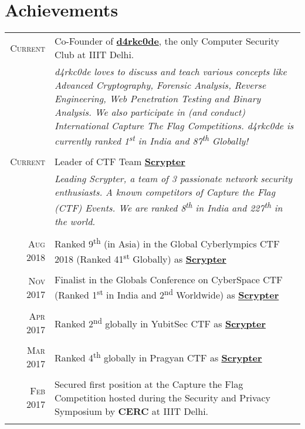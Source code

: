 \documentclass[a4paper,10pt]{article}
\begin{document}
\section{Achievements}
\begin{tabular}{r|p{13.7cm}}
\textsc{Current} & Co-Founder of \href{https://ctftime.org/team/15154}{\textbf{d4rkc0de}}, the only Computer Security Club at IIIT Delhi.  \\
& \emph{\small{d4rkc0de loves to discuss and teach various concepts like Advanced Cryptography, Forensic Analysis, Reverse Engineering, Web Penetration Testing and Binary Analysis. We also participate in (and conduct) International Capture The Flag Competitions. d4rkc0de is currently ranked 1\textsuperscript{st} in India and 87\textsuperscript{th} Globally!}}\\\multicolumn{2}{c}{}\\
\textsc{Current}& Leader of CTF Team \href{https://ctftime.org/team/31353}{\textbf{Scrypter}} \\
& \emph{\small{Leading Scrypter, a team of 3 passionate network security enthusiasts. A known competitors of Capture the Flag (CTF) Events. We are ranked 8\textsuperscript{th} in India and 227\textsuperscript{th} in the world. }}\\\multicolumn{2}{c}{}\\
\textsc{Aug} 2018 & Ranked 9\textsuperscript{th} (in Asia) in the Global Cyberlympics CTF 2018 (Ranked 41\textsuperscript{st} Globally) as \href{https://ctftime.org/team/31353}{\textbf{Scrypter}}\\\multicolumn{2}{c}{}\\
\textsc{Nov} 2017 & Finalist in the Globals Conference on CyberSpace CTF (Ranked 1\textsuperscript{st} in India and 2\textsuperscript{nd} Worldwide) as \href{https://ctftime.org/team/31353}{\textbf{Scrypter}}\\\multicolumn{2}{c}{}\\
\textsc{Apr} 2017 & Ranked 2\textsuperscript{nd} globally in YubitSec CTF as \href{https://ctftime.org/team/31353}{\textbf{Scrypter}}\\\multicolumn{2}{c}{}\\
\textsc{Mar} 2017 & Ranked 4\textsuperscript{th} globally in Pragyan CTF as \href{https://ctftime.org/team/31353}{\textbf{Scrypter}}\\\multicolumn{2}{c}{}\\
\textsc{Feb} 2017 & Secured first position at the Capture the Flag Competition hosted during the Security and Privacy Symposium by \textbf{CERC} at IIIT Delhi.\\\multicolumn{2}{c}{}\\

\end{tabular}
\end{document}
